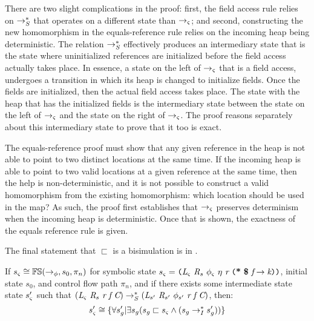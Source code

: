 There are two slight complications in the proof: first, the field
access rule relies on $\rightarrow_S^*$ that operates on a different
state than $\rightarrow_{\varsigma}$; and second, constructing the new
homomorphism in the equals-reference rule relies on the incoming heap
being deterministic. The relation $\rightarrow_S^*$ effectively produces
an intermediary state that is the state where uninitialized references
are initialized before the field access actually takes place. In
essence, a state on the left of $\rightarrow_{\varsigma}$ that is a
field access, undergoes a transition in which its heap is changed to
initialize fields. Once the fields are initialized, then the actual
field access takes place. The state with the heap that has the
initialized fields is the intermediary state between the state on the
left of $\rightarrow_{\varsigma}$ and the state on the right of $\rightarrow_{\varsigma}$. The proof reasons separately about this
intermediary state to prove that it too is exact.

The equals-reference proof must show that any given reference in the
heap is not able to point to two distinct locations at the same
time. If the incoming heap is able to point to two valid locations at
a given reference at the same time, then the help is
non-deterministic, and it is not possible to construct a valid
homomorphism from the existing homomorphism: which location should be
used in the map? As such, the proof first establishes that
$\rightarrow_{\varsigma}$ preserves determinism when the incoming heap is
deterministic. Once that is shown, the exactness of the equals
reference rule is given.

The final statement that $\sqsubset$ is a bisimulation is in .

\begin{lemma}
\label{lem:init}
If $s_{\varsigma} \cong \mathbb{FS}(\rightarrow_{\phi},s_0,\pi_n)$ for symbolic state $s_\sym = \lp \cfgnt{L}_\sym\ \cfgnt{R}_{s}\ \phi_\sym\ \eta\ \cfgnt{r}\ \lp \cfgt{*}\ \cfgt{\$}\ \cfgnt{f} \rightarrow \cfgnt{k}\rp \rp$, initial state $s_0$, and control flow path $\pi_n$, and if there exists some intermediate state state $s_{\varsigma}^\prime$ such that $(\cfgnt{L}_\sym\ \cfgnt{R}_{s}\ \cfgnt{r}\ \cfgnt{f} \ \cfgnt{C}) \rsum^* (\cfgnt{L}_{s^\prime}\ \cfgnt{R}_{s^\prime}\ \phi_{s^\prime}\ \cfgnt{r}\ \cfgnt{f} \ \cfgnt{C})$, then:
 $$s_{\varsigma}^\prime \cong \{\forall s_{g}^\prime | \exists s_{g} (s_{g} \sqsubset s_{\varsigma} \wedge (s_{g} \rightarrow_I^* s_{g}^\prime) ) \}$$
\end{lemma}

